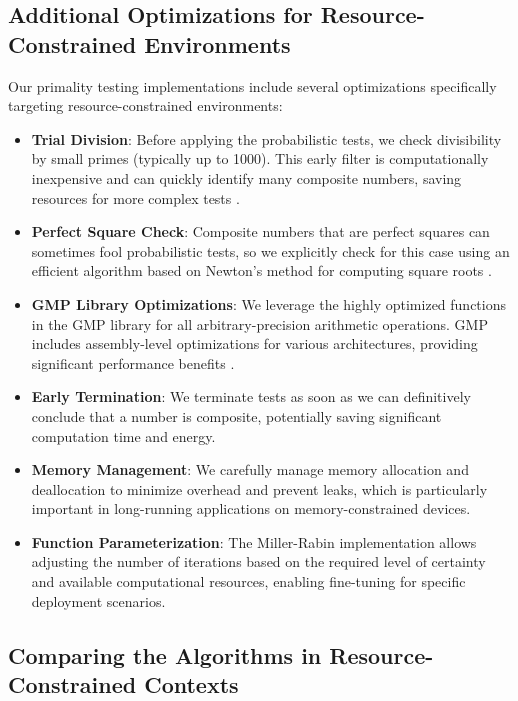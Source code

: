 \subsection{Additional Optimizations for Resource-Constrained Environments}

Our primality testing implementations include several optimizations specifically targeting resource-constrained environments:

\begin{itemize}
    \item \textbf{Trial Division}: Before applying the probabilistic tests, we check divisibility by small primes (typically up to 1000). This early filter is computationally inexpensive and can quickly identify many composite numbers, saving resources for more complex tests \cite{taxonomy_primality}.
    
    \item \textbf{Perfect Square Check}: Composite numbers that are perfect squares can sometimes fool probabilistic tests, so we explicitly check for this case using an efficient algorithm based on Newton's method for computing square roots \cite{crandall2005}.
    
    \item \textbf{GMP Library Optimizations}: We leverage the highly optimized functions in the GMP library for all arbitrary-precision arithmetic operations. GMP includes assembly-level optimizations for various architectures, providing significant performance benefits \cite{granlund2012}.
    
    \item \textbf{Early Termination}: We terminate tests as soon as we can definitively conclude that a number is composite, potentially saving significant computation time and energy.
    
    \item \textbf{Memory Management}: We carefully manage memory allocation and deallocation to minimize overhead and prevent leaks, which is particularly important in long-running applications on memory-constrained devices.
    
    \item \textbf{Function Parameterization}: The Miller-Rabin implementation allows adjusting the number of iterations based on the required level of certainty and available computational resources, enabling fine-tuning for specific deployment scenarios.
\end{itemize}

\subsection{Comparing the Algorithms in Resource-Constrained Contexts}

